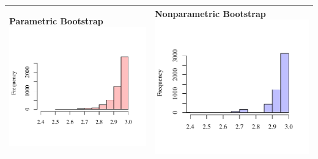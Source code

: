 \documentclass[11pt]{article}
\begin{document}
\begin{table}[h]
  \begin{center}
    \renewcommand{\arraystretch}{1.5}
    \begin{tabular}{| >{\centering\arraybackslash}m{3in} |  >{\centering\arraybackslash}m{3in} |}
      \hline
      Parametric Bootstrap
      \includegraphics[width=1\linewidth,height=0.3\textheight]{Graphs/parametricboot}&
      Nonparametric Bootstrap
      \includegraphics[width=1\linewidth,height=0.3\textheight]{Graphs/nonparametricboot}\\\hline
    \end{tabular}
  \end{center}
\end{table}
\end{document}
